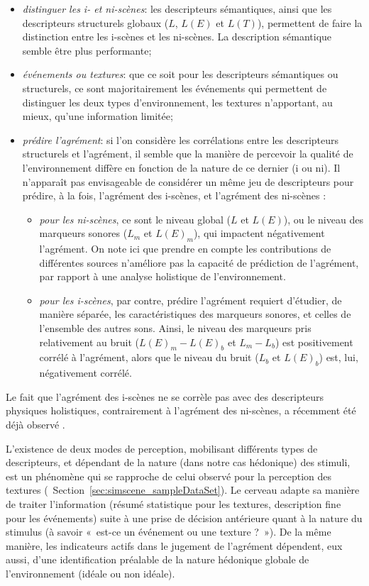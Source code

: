 \documentclass[twoside,twocolumn]{article}
\begin{document}
\begin{itemize}
\item \emph{distinguer les i- et ni-scènes}: les descripteurs sémantiques, ainsi que les descripteurs structurels globaux ($L$, $L(E)$ et $L(T)$), permettent de faire la distinction entre les i-scènes et les ni-scènes. La description sémantique semble être plus performante;
\item \emph{événements ou textures}: que ce soit pour les descripteurs sémantiques ou structurels, ce sont majoritairement les événements qui permettent de distinguer les deux types d'environnement, les textures n'apportant, au mieux, qu'une information limitée;
\item \emph{prédire l'agrément}: si l'on considère les corrélations entre les descripteurs structurels et l'agrément, il semble que la manière de percevoir la qualité de l'environnement diffère en fonction de la nature de ce dernier (i ou ni). Il n'apparaît pas envisageable de considérer un même jeu de descripteurs pour prédire, à la fois, l'agrément des i-scènes, et l'agrément des ni-scènes : 

\begin{itemize}

\item \emph{pour les ni-scènes}, ce sont le niveau global ($L$ et $L(E)$), ou le niveau des marqueurs sonores ($L_m$ et $L(E)_{m}$), qui impactent négativement l'agrément. On note ici que prendre en compte les contributions de différentes sources n'améliore pas la capacité de prédiction de l'agrément, par rapport à une analyse holistique de l'environnement. 

\item \emph{pour les i-scènes}, par contre, prédire l'agrément requiert d'étudier, de manière séparée, les caractéristiques des marqueurs sonores, et celles de l'ensemble des autres sons. Ainsi, le niveau des marqueurs pris relativement au bruit ($L(E)_m-L(E)_b$ et $L_m-L_b$) est positivement corrélé à l'agrément, alors que le niveau du bruit ($L_b$ et $L(E)_b$) est, lui, négativement corrélé.
\end{itemize} 
\end{itemize}

Le fait que l'agrément des i-scènes ne se corrèle pas avec des descripteurs physiques holistiques, contrairement à l'agrément des ni-scènes, a récemment été déjà observé \cite{gozalo2015relationship}.

L'existence de deux modes de perception, mobilisant différents types de descripteurs, et dépendant de la nature (dans notre cas hédonique) des stimuli, est un phénomène qui se rapproche de celui observé pour la perception des textures (\cf~Section~\ref{sec:simscene_sampleDataSet}). Le cerveau adapte sa manière de traiter l'information (résumé statistique pour les textures, description fine pour les événements) suite à une prise de décision antérieure quant à la nature du stimulus (à savoir «~est-ce un événement ou une texture ?~»). De la même manière, les indicateurs actifs dans le jugement de l'agrément dépendent, eux aussi, d'une identification préalable de la nature hédonique globale de l'environnement (idéale ou non idéale).
\end{document}
